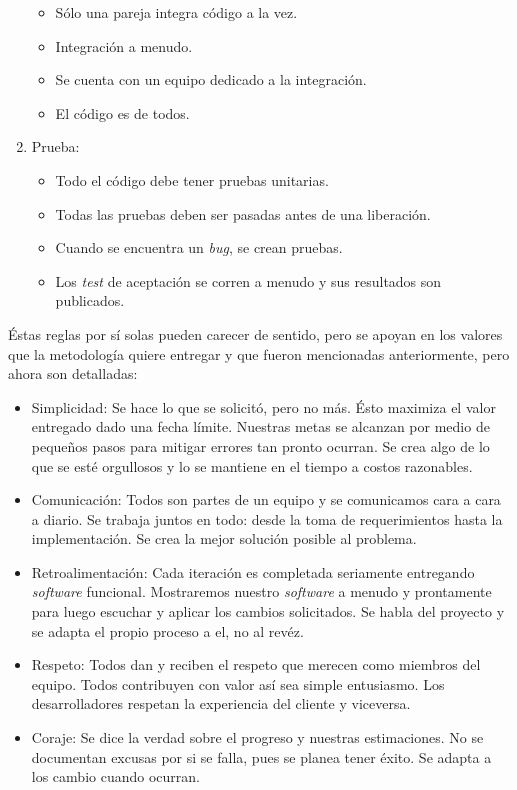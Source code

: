 \begin{enumerate}
\begin{itemize}
	\item Sólo una pareja integra código a la vez.
	\item Integración a menudo.
	\item Se cuenta con un equipo dedicado a la integración.
	\item El código es de todos.
	\end{itemize}
\item Prueba:
	\begin{itemize}
	\item Todo el código debe tener pruebas unitarias.
	\item Todas las pruebas deben ser pasadas antes de una liberación.
	\item Cuando se encuentra un \textit{bug}, se crean pruebas.
	\item Los \textit{test} de aceptación se corren a menudo y sus resultados son publicados.
	\end{itemize}
\end{enumerate}

Éstas reglas por sí solas pueden carecer de sentido, pero se apoyan en los valores que la metodología quiere entregar y que fueron mencionadas anteriormente, pero ahora son detalladas:

\begin{itemize}
\item Simplicidad: Se hace lo que se solicitó, pero no más. Ésto maximiza el valor entregado dado una fecha límite. Nuestras metas se alcanzan por medio de pequeños pasos para mitigar errores tan pronto ocurran. Se crea algo de lo que se esté orgullosos y lo se mantiene en el tiempo a costos razonables.
\item Comunicación: Todos son partes de un equipo y se comunicamos cara a cara a diario. Se trabaja juntos en todo: desde la toma de requerimientos hasta la implementación. Se crea la mejor solución posible al problema.
\item Retroalimentación: Cada iteración es completada seriamente entregando \textit{software} funcional. Mostraremos nuestro \textit{software} a menudo y prontamente para luego escuchar y aplicar los cambios solicitados. Se habla del proyecto y se adapta el propio proceso a el, no al revéz.
\item Respeto: Todos dan y reciben el respeto que merecen como miembros del equipo. Todos contribuyen con valor así sea simple entusiasmo. Los desarrolladores respetan la experiencia del cliente y viceversa. 
\item Coraje: Se dice la verdad sobre el progreso y nuestras estimaciones. No se documentan excusas por si se falla, pues se planea tener éxito. Se adapta a los cambio cuando ocurran.
\end{itemize}

